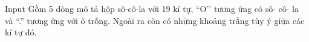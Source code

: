 Input
Gồm 5 dòng mô tả hộp sô-cô-la với 19 kí tự, “O’’ tương ứng có sô- cô- la và “.” tương ứng với ô trống. Ngoài ra còn có những khoảng trắng tùy ý giữa các kí tự đó.